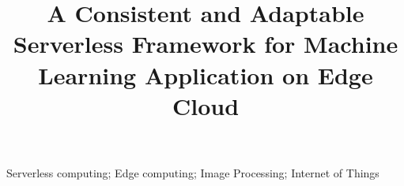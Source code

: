 \documentclass[10pt, conference, compsocconf]{IEEEtran}
\begin{document}
\title{A Consistent and Adaptable Serverless Framework for Machine Learning Application on Edge Cloud}

\author{
}




\maketitle

% 

\begin{IEEEkeywords}
Serverless computing; Edge computing; Image Processing; Internet of Things
\end{IEEEkeywords}


%
\IEEEpeerreviewmaketitle

% 

%

% 
\end{document}
